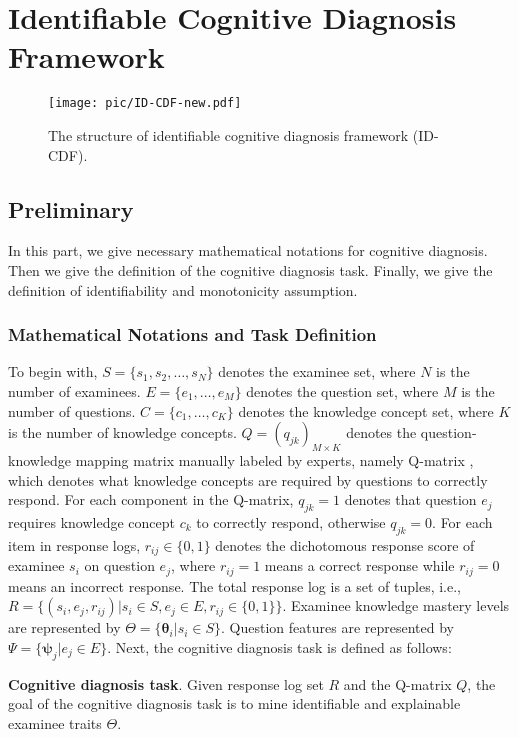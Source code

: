 \documentclass[sigconf]{acmart}
\begin{document}
\section{Identifiable Cognitive Diagnosis Framework}
\begin{figure*}[t]
  \centering 
  \texttt{[image: pic/ID-CDF-new.pdf]} 
  \vspace{-10pt}
  \caption{The structure of identifiable cognitive diagnosis framework (ID-CDF).}
  \label{fig:id-cd}
  \vspace{-15pt}
\end{figure*} 

\subsection{Preliminary}
\par In this part, we give necessary mathematical notations for cognitive diagnosis. Then we give the definition of the cognitive diagnosis task. Finally, we give the definition of identifiability and monotonicity assumption. 
\vspace{-7pt}
\subsubsection{Mathematical Notations and Task Definition}\label{sec:Preliminary}
\par To begin with, $S = \{s_1, s_2, \ldots, s_N\}$ denotes the examinee set, where $N$ is the number of examinees. $E = \{e_1,\ldots, e_M\}$ denotes the question set, where $M$ is the number of questions. $C = \{c_1,\ldots,c_K\}$ denotes the knowledge concept set, where $K$ is the number of knowledge concepts. $Q=(q_{jk})_{M\times K}$ denotes the question-knowledge mapping matrix manually labeled by experts, namely Q-matrix \cite{Tatsuoka1983}, which denotes what knowledge concepts are required by questions to correctly respond. For each component in the Q-matrix, $q_{jk}=1$ denotes that question $e_j$ requires knowledge concept $c_k$ to correctly respond, otherwise $q_{jk}=0$. For each item in response logs, $r_{ij}\in\{0,1\}$ denotes the dichotomous response score of examinee $s_i$ on question $e_j$, where $r_{ij}=1$ means a correct response while $r_{ij}=0$ means an incorrect response. The total response log is a set of tuples, i.e., $R=\{(s_i, e_j, r_{ij})|s_i\in S, e_j\in E, r_{ij}\in\{0,1\}\}$. Examinee knowledge mastery levels are represented by $\Theta = \{\bm{\theta}_i| s_i\in S\}$. Question features are represented by $\Psi = \{\bm{\psi}_j|e_j\in E\}$. Next, the cognitive diagnosis task is defined as follows:
\vspace{-5pt}
\begin{definition}
  \textbf{Cognitive diagnosis task}. Given response log set $R$ and the Q-matrix $Q$, the goal of the cognitive diagnosis task is to mine identifiable and explainable examinee traits $\Theta$. 
\end{definition}
\vspace{-9pt}
\end{document}
